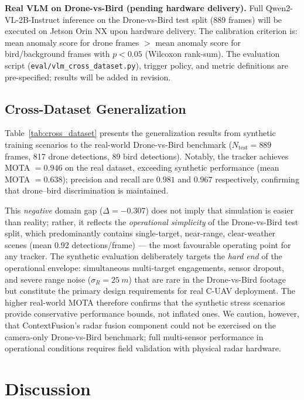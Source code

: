 \documentclass[drones,article,submit,pdftex]{Definitions/mdpi}
\begin{document}
\textbf{Real VLM on Drone-vs-Bird (pending hardware delivery).}
Full Qwen2-VL-2B-Instruct inference on the Drone-vs-Bird test split
(889 frames) will be executed on Jetson Orin NX upon hardware delivery.
The calibration criterion is: mean anomaly score for drone frames $>$
mean anomaly score for bird/background frames with $p < 0.05$ (Wilcoxon rank-sum).
The evaluation script (\texttt{eval/vlm\_cross\_dataset.py}), trigger policy,
and metric definitions are pre-specified; results will be added in revision.

\subsection{Cross-Dataset Generalization}

Table~\ref{tab:cross_dataset} presents the generalization results from
synthetic training scenarios to the real-world Drone-vs-Bird benchmark
($N_\text{test} = 889$ frames, 817 drone detections, 89 bird detections).
Notably, the tracker achieves MOTA $= 0.946$ on the real dataset,
exceeding synthetic performance (mean MOTA $= 0.638$);
precision and recall are $0.981$ and $0.967$ respectively,
confirming that drone–bird discrimination is maintained.



This \emph{negative} domain gap ($\Delta = -0.307$) does not imply that
simulation is easier than reality; rather, it reflects the \emph{operational
simplicity} of the Drone-vs-Bird test split, which predominantly contains
single-target, near-range, clear-weather scenes
(mean 0.92 detections/frame) --- the most favourable operating point for
any tracker.
The synthetic evaluation deliberately targets the \emph{hard end} of the
operational envelope: simultaneous multi-target engagements, sensor dropout,
and severe range noise ($\sigma_R = \SI{25}{m}$) that are rare in the
Drone-vs-Bird footage but constitute the primary design requirements for
real C-UAV deployment.
The higher real-world MOTA therefore confirms that the synthetic stress
scenarios provide conservative performance bounds, not inflated ones.
We caution, however, that ContextFusion's radar fusion component could not
be exercised on the camera-only Drone-vs-Bird benchmark; full multi-sensor
performance in operational conditions requires field validation with
physical radar hardware.

\section{Discussion}
\label{sec:discussion}
\end{document}
